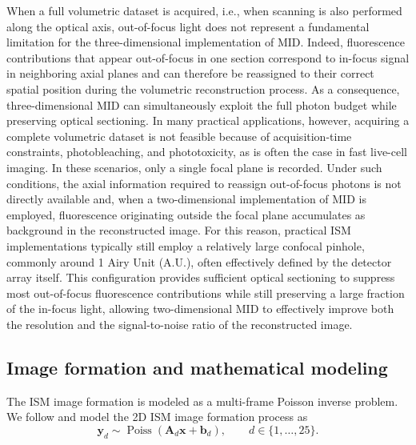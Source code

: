 \documentclass[letterpaper]{article}
\newcommand{\x}{\mathbf{x}}
\newcommand{\A}{\mathbf{A}}
\begin{document}
When a full volumetric dataset is acquired, i.e., when scanning is also performed along the optical axis, out-of-focus light does not represent a fundamental limitation for the three-dimensional implementation of MID. Indeed, fluorescence contributions that appear out-of-focus in one section correspond to in-focus signal in neighboring axial planes and can therefore be reassigned to their correct spatial position during the volumetric reconstruction process. As a consequence, three-dimensional MID can simultaneously exploit the full photon budget while preserving optical sectioning. In many practical applications, however, acquiring a complete volumetric dataset is not feasible because of acquisition-time constraints, photobleaching, and phototoxicity, as is often the case in fast live-cell imaging. In these scenarios, only a single focal plane is recorded. Under such conditions, the axial information required to reassign out-of-focus photons is not directly available and, when a two-dimensional implementation of MID is employed, fluorescence originating outside the focal plane accumulates as background in the reconstructed image. For this reason, practical ISM implementations typically still employ a relatively large confocal pinhole, commonly around 1 Airy Unit (A.U.), often effectively defined by the detector array itself. This configuration provides sufficient optical sectioning to suppress most out-of-focus fluorescence contributions while still preserving a large fraction of the in-focus light, allowing two-dimensional MID to effectively improve both the resolution and the signal-to-noise ratio of the reconstructed image. 
\subsection{Image formation and mathematical modeling}
\label{sec:math_mod_oneplane}
The ISM image formation is modeled as a multi-frame Poisson inverse problem. We follow \cite{Bertero} and model the 2D ISM image formation process as
\begin{equation}
\label{for_problem}
    \mathbf{y}_d \sim \operatorname{Poiss}(\A_d \x + \mathbf{b}_d),
    \qquad d \in \{1, \dots, 25\}.
\end{equation}
\end{document}
